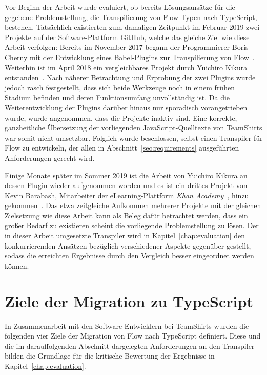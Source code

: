 Vor Beginn der Arbeit wurde evaluiert, ob bereits Lösungsansätze für die gegebene Problemstellung, die Transpilierung von Flow-Typen nach TypeScript, bestehen. Tatsächlich existierten zum damaligen Zeitpunkt im Februar 2019 zwei Projekte auf der Software-Plattform GitHub, welche das gleiche Ziel wie diese Arbeit verfolgen: Bereits im November 2017 begann der Programmierer Boris Cherny mit der Entwicklung eines Babel-Plugins zur Transpilierung von Flow~\autocite{CHERNY:FLOW_TO_TS}. Weiterhin ist im April 2018 ein vergleichbares Projekt durch Yuichiro Kikura entstanden~\autocite{KIKURA:FLOW_TO_TS}. Nach näherer Betrachtung und Erprobung der zwei Plugins wurde jedoch rasch festgestellt, dass sich beide Werkzeuge noch in einem frühen Stadium befinden und deren Funktionsumfang unvollständig ist. Da die Weiterentwicklung der Plugins darüber hinaus nur sporadisch vorangetrieben wurde, wurde angenommen, dass die Projekte inaktiv sind. Eine korrekte, ganzheitliche Übersetzung der vorliegenden JavaScript-Quelltexte von TeamShirts war somit nicht umsetzbar. Folglich wurde beschlossen, selbst einen Transpiler für Flow zu entwickeln, der allen in Abschnitt~\ref{sec:requirements} ausgeführten Anforderungen gerecht wird.

Einige Monate später im Sommer 2019 ist die Arbeit von Yuichiro Kikura an dessen Plugin wieder aufgenommen worden und es ist ein drittes Projekt von Kevin Barabash, Mitarbeiter der eLearning-Plattform \textit{Khan Academy}~\autocite{KHAN_ACADEMY}, hinzu gekommen~\autocite{BARABASH:FLOW_TO_TS}. Das etwa zeitgleiche Aufkommen mehrerer Projekte mit der gleichen Zielsetzung wie diese Arbeit kann als Beleg dafür betrachtet werden, dass ein großer Bedarf zu existieren scheint die vorliegende Problemstellung zu lösen.
Der in dieser Arbeit umgesetzte Transpiler wird in Kapitel~\ref{chap:evaluation} den konkurrierenden Ansätzen bezüglich verschiedener Aspekte gegenüber gestellt, sodass die erreichten Ergebnisse durch den Vergleich besser eingeordnet werden können.

\section{Ziele der Migration zu TypeScript}
\label{sec:goals}

In Zusammenarbeit mit den Software-Entwicklern bei TeamShirts wurden die folgenden vier Ziele der Migration von Flow nach TypeScript definiert. Diese und die im darauffolgenden Abschnitt dargelegten Anforderungen an den Transpiler bilden die Grundlage für die kritische Bewertung der Ergebnisse in Kapitel~\ref{chap:evaluation}.

